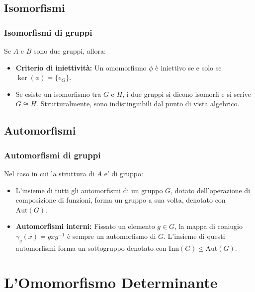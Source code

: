 \subsection{Isomorfismi}

\subsubsection{Isomorfismi di gruppi}
Se $ A $ e $ B $ sono due gruppi, allora:
\begin{itemize}
    \item \textbf{Criterio di iniettività:} Un omomorfismo $\phi$ è iniettivo se e solo se $\ker(\phi) = \{e_G\}$.
    \item Se esiste un isomorfismo tra $G$ e $H$, i due gruppi si dicono isomorfi e si scrive $G \cong H$. Strutturalmente, sono indistinguibili dal punto di vista algebrico.
\end{itemize}

\subsection{Automorfismi}

\subsubsection{Automorfismi di gruppi}
Nel caso in cui la struttura di $ A $ e' di gruppo:
\begin{itemize}
    \item L'insieme di tutti gli automorfismi di un gruppo $G$, dotato dell'operazione di composizione di funzioni, forma un gruppo a sua volta, denotato con $\text{Aut}(G)$.
    \item \textbf{Automorfismi interni:} Fissato un elemento $g \in G$, la mappa di coniugio $\gamma_g(x) = gxg^{-1}$ è sempre un automorfismo di $G$. L'insieme di questi automorfismi forma un sottogruppo denotato con $\text{Inn}(G) \trianglelefteq \text{Aut}(G)$.
\end{itemize}

\section{L'Omomorfismo Determinante}


